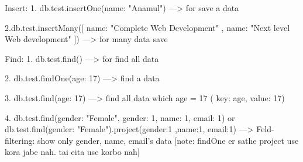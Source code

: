 Insert:
1. db.test.insertOne({name: "Anamul"})
---> for save a data

2.db.test.insertMany([
    { name: "Complete Web Development" },
    { name: "Next level Web development" }
])
---> for many data save




Find:
1. db.test.find({})
---> for find all data

2. db.test.findOne({age: 17})
---> find a data

3. db.test.find({age: 17})
---> find all data which age = 17 ( key: age, value: 17)

4. db.test.find({gender: "Female"}, {gender: 1, name: 1, email: 1}) 
or  db.test.find({gender: "Female"}).project({gender:1 ,name:1, email:1}) 
---> Feld-filtering: show only gender, name, email's data 
[note: findOne er sathe project use kora jabe nah. tai eita use korbo nah]




